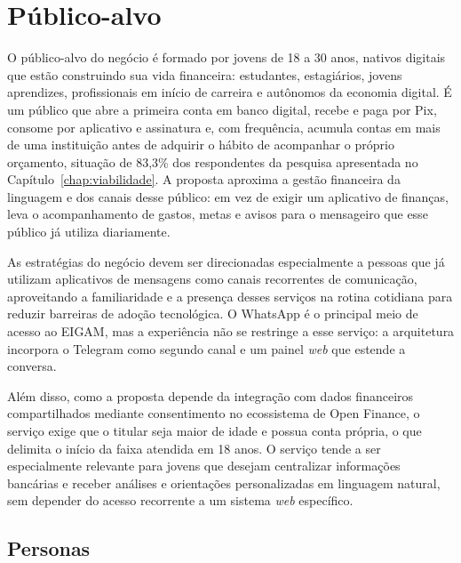 \section{Público-alvo}

O público-alvo do negócio é formado por jovens de 18 a 30 anos, nativos digitais que estão construindo sua vida financeira: estudantes, estagiários, jovens aprendizes, profissionais em início de carreira e autônomos da economia digital. É um público que abre a primeira conta em banco digital, recebe e paga por Pix, consome por aplicativo e assinatura e, com frequência, acumula contas em mais de uma instituição antes de adquirir o hábito de acompanhar o próprio orçamento, situação de 83,3\% dos respondentes da pesquisa apresentada no Capítulo~\ref{chap:viabilidade}. A proposta aproxima a gestão financeira da linguagem e dos canais desse público: em vez de exigir um aplicativo de finanças, leva o acompanhamento de gastos, metas e avisos para o mensageiro que esse público já utiliza diariamente.

As estratégias do negócio devem ser direcionadas especialmente a pessoas que já utilizam aplicativos de mensagens como canais recorrentes de comunicação, aproveitando a familiaridade e a presença desses serviços na rotina cotidiana para reduzir barreiras de adoção tecnológica. O WhatsApp é o principal meio de acesso ao EIGAM, mas a experiência não se restringe a esse serviço: a arquitetura incorpora o Telegram como segundo canal e um painel \textit{web} que estende a conversa.

Além disso, como a proposta depende da integração com dados financeiros compartilhados mediante consentimento no ecossistema de Open Finance, o serviço exige que o titular seja maior de idade e possua conta própria, o que delimita o início da faixa atendida em 18 anos. O serviço tende a ser especialmente relevante para jovens que desejam centralizar informações bancárias e receber análises e orientações personalizadas em linguagem natural, sem depender do acesso recorrente a um sistema \textit{web} específico.

\subsection{Personas}

